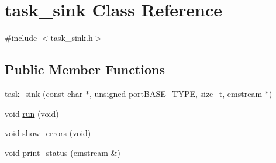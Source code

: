 \hypertarget{classtask__sink}{\section{task\-\_\-sink \-Class \-Reference}
\label{classtask__sink}
}


{\ttfamily \#include $<$task\-\_\-sink.\-h$>$}

\subsection*{\-Public \-Member \-Functions}
\begin{DoxyCompactItemize}
\item 
\hyperlink{classtask__sink_af0700c1b88de258c45dd3a65f91ac5d0}{task\-\_\-sink} (const char $\ast$, unsigned port\-B\-A\-S\-E\-\_\-\-T\-Y\-P\-E, size\-\_\-t, emstream $\ast$)
\item 
void \hyperlink{classtask__sink_a90497d9f3e918301d3643181e6e8a42d}{run} (void)
\item 
void \hyperlink{classtask__sink_a13ab68837b0138fb6dbd488dff4e6175}{show\-\_\-errors} (void)
\item 
void \hyperlink{classtask__sink_a16c0c8249299c81490190d0a2a13f7ee}{print\-\_\-status} (emstream \&)
\end{DoxyCompactItemize}
